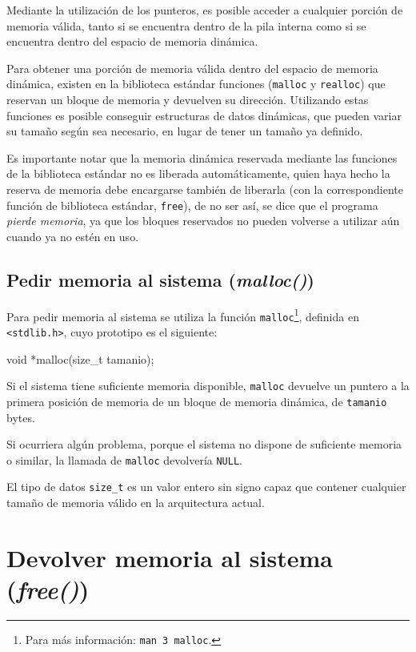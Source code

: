 Mediante la utilización de los punteros, es posible  acceder a cualquier
porción de memoria válida, tanto si se encuentra dentro de la pila interna
como si se encuentra dentro del espacio de memoria dinámica.

Para obtener una porción de memoria válida dentro del espacio de memoria
dinámica, existen en la biblioteca estándar funciones (\lstinline!malloc! y
\lstinline!realloc!) que reservan un bloque de memoria y devuelven su
dirección. Utilizando estas funciones es posible conseguir estructuras de
datos dinámicas, que pueden variar su tamaño según sea necesario, en lugar de
tener un tamaño ya definido.

Es importante notar que la memoria dinámica reservada mediante las funciones
de la biblioteca estándar no es liberada automáticamente, quien haya hecho la
reserva de memoria debe encargarse también de liberarla (con la
correspondiente función de biblioteca estándar, \lstinline!free!), de no ser
así, se dice que el programa \textit{pierde memoria}, ya que los bloques
reservados no pueden volverse a utilizar aún cuando ya no estén en uso.

\subsection{Pedir memoria al sistema (\textit{malloc()})}

Para pedir memoria al sistema se utiliza la función
\lstinline!malloc!\footnote{Para más información: \texttt{man 3 malloc}.},
definida en \lstinline!<stdlib.h>!, cuyo prototipo es el siguiente:

\begin{codigo-c-plano}
void *malloc(size_t tamanio);
\end{codigo-c-plano}

Si el sistema tiene suficiente memoria disponible, \lstinline!malloc! devuelve
un puntero a la primera posición de memoria de un bloque de memoria dinámica,
de \lstinline!tamanio! bytes.

Si ocurriera algún problema, porque el sistema no dispone de suficiente memoria
o similar, la llamada de \lstinline!malloc! devolvería \lstinline!NULL!.

El tipo de datos \lstinline!size_t! es un valor entero sin signo capaz que
contener cualquier tamaño de memoria válido en la arquitectura actual.

\section{Devolver memoria al sistema (\textit{free()})}

